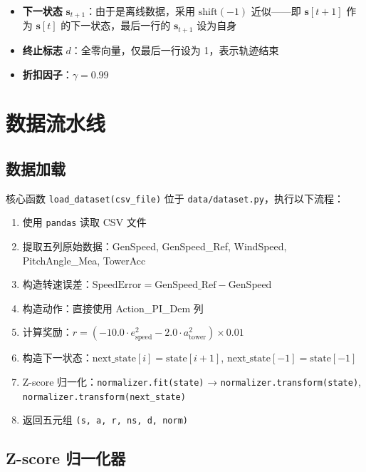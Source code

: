 \documentclass[11pt,a4paper]{ctexart}
\newcommand{\pkg}[1]{\texttt{#1}}
\newcommand{\file}[1]{\texttt{#1}}
\newcommand{\code}[1]{\texttt{#1}}
\begin{document}
\begin{itemize}
    \item \textbf{下一状态} $\mathbf{s}_{t+1}$：由于是离线数据，采用 $\text{shift}(-1)$ 近似——即 $\mathbf{s}[t+1]$ 作为 $\mathbf{s}[t]$ 的下一状态，最后一行的 $\mathbf{s}_{t+1}$ 设为自身
    \item \textbf{终止标志} $d$：全零向量，仅最后一行设为 1，表示轨迹结束
    \item \textbf{折扣因子}：$\gamma = 0.99$
\end{itemize}

\newpage

\section{数据流水线}

\subsection{数据加载}

核心函数 \code{load\_dataset(csv\_file)} 位于 \file{data/dataset.py}，执行以下流程：

\begin{enumerate}
    \item 使用 \pkg{pandas} 读取 CSV 文件
    \item 提取五列原始数据：GenSpeed, GenSpeed\_Ref, WindSpeed, PitchAngle\_Mea, TowerAcc
    \item 构造转速误差：$\text{SpeedError} = \text{GenSpeed\_Ref} - \text{GenSpeed}$
    \item 构造动作：直接使用 Action\_PI\_Dem 列
    \item 计算奖励：$r = (-10.0 \cdot e_{\text{speed}}^2 - 2.0 \cdot a_{\text{tower}}^2) \times 0.01$
    \item 构造下一状态：$\text{next\_state}[i] = \text{state}[i+1]$, $\text{next\_state}[-1] = \text{state}[-1]$
    \item Z-score 归一化：\code{normalizer.fit(state)} → \code{normalizer.transform(state)}, \code{normalizer.transform(next\_state)}
    \item 返回五元组 \code{(s, a, r, ns, d, norm)}
\end{enumerate}

\subsection{Z-score 归一化器}
\end{document}
